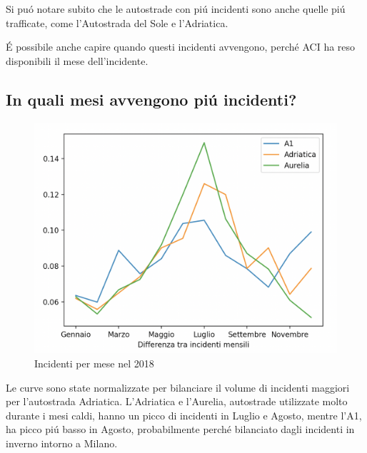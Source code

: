 \documentclass[a4paper]{report}
\begin{document}
Si pu\'o notare subito che le autostrade con pi\'u incidenti sono anche quelle pi\'u trafficate, come 
l'Autostrada del Sole e l'Adriatica.




\'E possibile anche capire quando questi incidenti avvengono, perch\'e ACI ha reso disponibili il mese 
dell'incidente.

\newpage
\subsection{In quali mesi avvengono pi\'u incidenti?}
\begin{figure}[!ht]
    \includegraphics[width=\linewidth]{../src/incidenti/incidenti_aci/mesi_autostrade.png}
    \caption{Incidenti per mese nel 2018}
    \label{fig:incidenti_per_mese}
\end{figure}

Le curve sono state normalizzate per bilanciare il volume di incidenti maggiori per 
l'autostrada Adriatica.
L'Adriatica e l'Aurelia, autostrade utilizzate molto durante i mesi caldi, hanno un picco di 
incidenti in Luglio e Agosto, mentre l'A1, ha picco pi\'u basso in Agosto, probabilmente 
perch\'e bilanciato dagli incidenti in inverno intorno a Milano.
\end{document}
